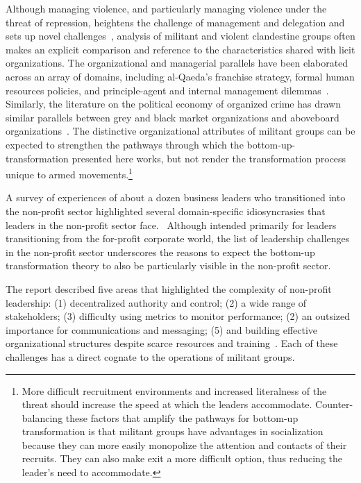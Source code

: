 Although managing violence, and particularly managing violence under the threat of repression, heightens the challenge of management and delegation and sets up novel challenges~\autocite{della2013clandestine, oots1986political, shapiro2012moral}, analysis of militant and violent clandestine groups often makes an explicit comparison and reference to the characteristics shared with licit organizations. The organizational and managerial parallels have been elaborated across an array of domains, including al-Qaeda's franchise strategy, formal human resources policies, and principle-agent and internal management dilemmas~\autocite{berman2011can, byman2010agents, crenshaw1987theories, cunningham2013actor, dtr2011papertrail, eid2017french, farrall2011qaeda, hoovergreen2016, nwajiaku2012political, salehyan2014external, shapiro2012terrorist, shapiro2013terrorist, skaperdas2002warlord, tamm2016rebel,wright2006looming, zaw2017hr}. Similarly, the literature on the political economy of organized crime has drawn similar parallels between grey and black market organizations and aboveboard organizations~\autocite{cappellaro2020maintaining, leeson2007arrgh, skaperdas2001political, skarbek2011governance, sullivan2002drug}.  The distinctive organizational attributes of militant groups can be expected to strengthen the pathways through which the bottom-up-transformation presented here works, but not render the transformation process unique to armed movements.\footnote{More difficult recruitment environments and increased literalness of the  threat should increase the speed at which the leaders accommodate. Counter-balancing these factors that amplify the pathways for bottom-up transformation is that militant groups have advantages in socialization because they can more easily monopolize the attention and contacts of their recruits. They can also make exit a more difficult option, thus reducing the leader’s need to accommodate.}

A survey of experiences of about a dozen business leaders who transitioned into the non-profit sector highlighted several domain-specific idiosyncrasies that leaders in the non-profit sector face.~\autocite{taliento2005corporate} Although intended primarily for leaders transitioning from the for-profit corporate world, the list of leadership challenges in the non-profit sector underscores the reasons to expect the bottom-up transformation theory to also be particularly visible in the non-profit sector.

The report described five areas that highlighted the complexity of non-profit leadership: (1) decentralized authority and control; (2) a wide range of stakeholders; (3) difficulty using metrics to monitor performance; (2) an outsized importance for communications and messaging; (5) and building effective organizational structures despite scarce resources and training~\autocite{taliento2005corporate}. Each of these challenges has a direct cognate to the operations of militant groups.

